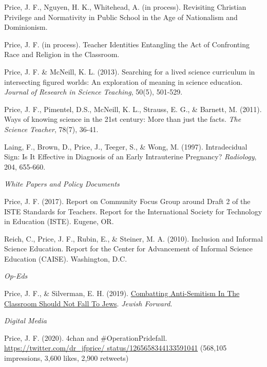 \documentclass[11pt,article,oneside]{memoir}
\begin{document}
\ind Price, J. F., Nguyen, H. K., Whitehead, A. (in process). Revisiting Christian Privilege and Normativity in Public School in the Age of Nationalism and Dominionism.

\ind Price, J. F. (in process). Teacher Identities Entangling the Act of Confronting Race and Religion in the Classroom.

\ind Price, J. F. \& McNeill, K. L. (2013). Searching for a lived science curriculum in intersecting figured worlds: An exploration of meaning in science education. \textit{Journal of Research in Science Teaching}, 50(5), 501-529.

\ind Price, J. F., Pimentel, D.S., McNeill, K. L., Strauss, E. G., \& Barnett, M. (2011). Ways of knowing science in the 21st century: More than just the facts. \textit{The Science Teacher}, 78(7), 36-41.

\ind Laing, F., Brown, D., Price, J., Teeger, S., \& Wong, M. (1997). Intradecidual Sign: Is It Effective in Diagnosis of an Early Intrauterine Pregnancy? \textit{Radiology}, 204, 655-660.

\bigskip
\noindent\emph{White Papers and Policy Documents \vspace{0.05in}}

\ind Price, J. F. (2017). Report on Community Focus Group around Draft 2 of the ISTE Standards for Teachers. Report for the International Society for Technology in Education (ISTE). Eugene, OR.

\ind Reich, C., Price, J. F., Rubin, E., \& Steiner, M. A. (2010). Inclusion and Informal Science Education. Report for the Center for Advancement of Informal Science Education (CAISE). Washington, D.C.

\bigskip
\noindent\emph{Op-Eds \vspace{0.05in}}

\ind Price, J. F., \& Silverman, E. H. (2019). \href{https://forward.com/opinion/426018/combatting-anti-semitism-in-the-classroom-should-not-fall-to-jews/}{Combatting Anti-Semitism In The Classroom Should Not Fall To Jews}. \textit{Jewish Forward}.

\bigskip
\noindent\emph{Digital Media \vspace{0.05in}}

\ind Price, J. F. (2020). 4chan and \#OperationPridefall. \href{https://twitter.com/dr\_jfprice/status/1265658344133591041}{https://twitter.com/dr\_jfprice/ \newline status/1265658344133591041} (568,105 impressions, 3,600 likes, 2,900 retweets)
\end{document}
